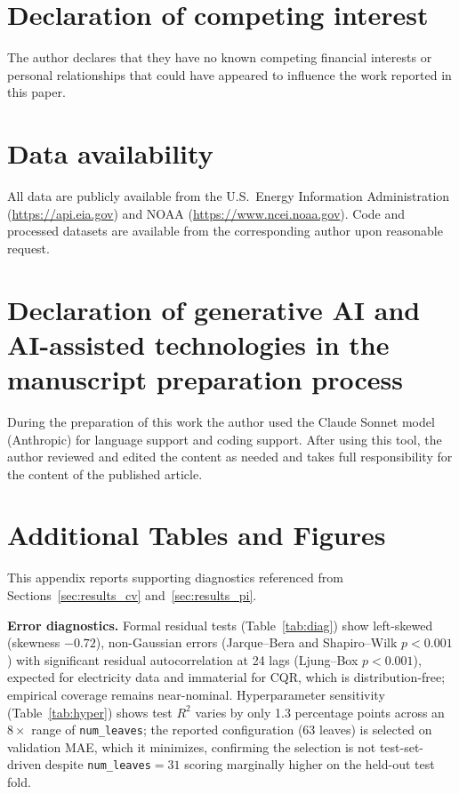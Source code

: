 \documentclass[preprint,12pt,authoryear]{elsarticle}
\begin{document}
\section*{Declaration of competing interest}
The author declares that they have no known competing financial interests or personal relationships that could have appeared to influence the work reported in this paper.

\section*{Data availability}
All data are publicly available from the U.S.\ Energy Information Administration (\url{https://api.eia.gov}) and NOAA (\url{https://www.ncei.noaa.gov}). Code and processed datasets are available from the corresponding author upon reasonable request.

\section*{Declaration of generative AI and AI-assisted technologies in the manuscript preparation process}
During the preparation of this work the author used the Claude Sonnet model (Anthropic) for language support and coding support. After using this tool, the author reviewed and edited the content as needed and takes full responsibility for the content of the published article.

\appendix
\setcounter{table}{0}
\setcounter{figure}{0}
\section{Additional Tables and Figures}
\label{app:a}

This appendix reports supporting diagnostics referenced from Sections~\ref{sec:results_cv} and~\ref{sec:results_pi}.

\textbf{Error diagnostics.} Formal residual tests (Table~\ref{tab:diag}) show left-skewed (skewness $-0.72$), non-Gaussian errors (Jarque--Bera and Shapiro--Wilk $p < 0.001$) with significant residual autocorrelation at 24 lags (Ljung--Box $p < 0.001$), expected for electricity data and immaterial for CQR, which is distribution-free; empirical coverage remains near-nominal. Hyperparameter sensitivity (Table~\ref{tab:hyper}) shows test $R^2$ varies by only 1.3 percentage points across an $8\times$ range of \texttt{num\_leaves}; the reported configuration (63 leaves) is selected on validation MAE, which it minimizes, confirming the selection is not test-set-driven despite \texttt{num\_leaves}$=31$ scoring marginally higher on the held-out test fold.
\end{document}
